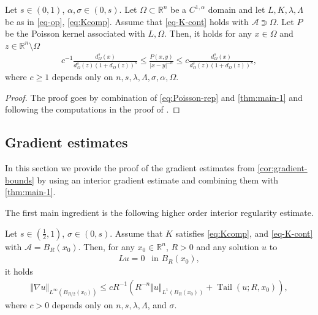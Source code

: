 \documentclass[11pt,reqno]{amsart}
\theoremstyle{plain}
\theoremstyle{definition}
\numberwithin{equation}{section}
\newcommand{\R}{\mathbb{R}}
\newcommand{\1}{\mathbbm{1}}
\DeclareMathOperator{\tail}{Tail}
\begin{document}
\begin{corollary}
    \label{cor:Poisson}
     Let $s \in (0,1)$, $\alpha,\sigma \in (0,s)$. Let $\Omega \subset \R^n$ be a $C^{1,\alpha}$ domain and let $L,K, \lambda, \Lambda$ be as in \eqref{eq-op}, \eqref{eq:Kcomp}. Assume that \eqref{eq-K-cont} holds with $\mathcal{A} \Supset \Omega$. Let $P$ be the Poisson kernel associated with $L,\Omega$. Then, it holds for any $x \in \Omega$ and $z \in \R^n \setminus \Omega$
     \begin{align*}
         c^{-1} \frac{d^s_{\Omega}(x)}{d^s_{\Omega}(z)(1 + d_{\Omega}(z))^s}  \le \frac{P(x,y)}{|x-y|^{-n}} \le c \frac{d^s_{\Omega}(x)}{d^s_{\Omega}(z)(1 + d_{\Omega}(z))^s} ,
     \end{align*}
     where $c \geq 1$ depends only on $n,s,\lambda,\Lambda,\sigma,\alpha,\Omega$.
\end{corollary}

\begin{proof}
    The proof goes by combination of \eqref{eq:Poisson-rep} and \autoref{thm:main-1} and following the computations in the proof of \cite[Theorem 1.5]{ChSo98}.
\end{proof}

\subsection{Gradient estimates}

In this section we provide the proof of the gradient estimates from \autoref{cor:gradient-bounds} by using an interior gradient estimate and combining them with \autoref{thm:main-1}.


The first main ingredient is the following higher order interior regularity estimate.

\begin{lemma}\cite[Theorem~1.9]{KNS22}
\label{lemma:int-gradient-est}
Let $s \in (\frac{1}{2},1)$, $\sigma \in (0,s)$. Assume that $K$ satisfies \eqref{eq:Kcomp}, and \eqref{eq-K-cont} with $\mathcal{A} = B_R(x_0)$.
Then, for any $x_0 \in \R^n$, $R > 0$ and any solution $u$ to
\begin{align*}
L u = 0 ~~ \text{ in } B_R(x_0),
\end{align*}
it holds
\begin{align*}
\Vert \nabla u \Vert_{L^{\infty}(B_{R/2}(x_0))} \le c R^{-1} \left( R^{-n} \Vert u \Vert_{L^{1}(B_{R}(x_0))} + \tail(u;R,x_0) \right),
\end{align*}
where $c > 0$ depends only on $n,s,\lambda,\Lambda$, and $\sigma$.
\end{lemma}
\end{document}
